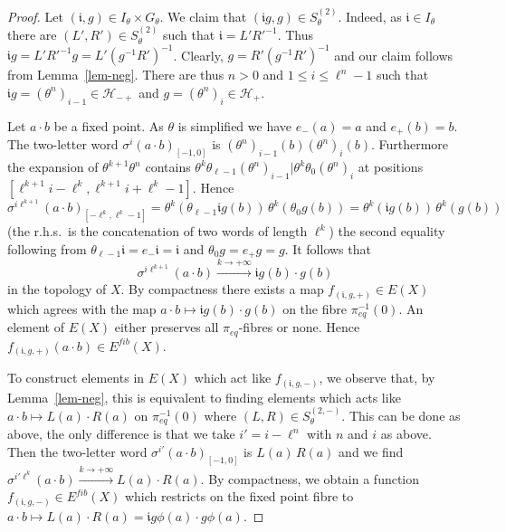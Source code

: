 \documentclass[10pt,a4paper]{amsart}
\numberwithin{equation}{section}
\newcommand{\ii}{{\mathfrak i}}
\newcommand{\Hh}{{\mathcal H}}
\newcommand{\pe}{\pi_{eq}}
\newcommand{\Ef}{E^{fib}}
\begin{document}
\begin{proof}
Let $(\ii ,g)\in I_\theta \times G_\theta$.
We claim that $(\ii g,g)\in S^{(2)}_\theta$. Indeed, as $\ii\in I_\theta$ there are 
$(L',R')\in S^{(2)}_\theta$ such that $\ii = L'{R'}^{-1}$. Thus
  $\ii g = L'{R'}^{-1}g = L'(g^{-1} R')^{-1}$. Clearly, $g = R' (g^{-1} R')^{-1}$ and our claim follows from Lemma~\ref{lem-neg}.
There are thus $n>0$ and $1\leq i\leq \ell^n-1$ such that
$ \ii g =(\theta^n)_{i-1}\in \Hh_{-+}$ and $g =(\theta^n)_i\in \Hh_+$.
 
Let $a\cdot b$ be a fixed point. As $\theta$ is simplified we have $e_{-}(a) = a$ and $e_{+}(b) = b$.
The two-letter word $\sigma^{i}(a\cdot b)_{[-1,0]}$ is $(\theta^n)_{i-1}(b)(\theta^n)_i(b)$. Furthermore 
the expansion of 
$\theta^{k+1}\theta^n$ contains $\theta^k\theta_{\ell-1} (\theta^n)_{i-1}| \theta^k\theta_0 (\theta^n)_{i}$ at positions  
 $[\ell^{k+1}i- \ell^k,\ell^{k+1}i+\ell^k-1]$.
Hence 
$$\sigma^{i\ell^{k+1}}(a\cdot b)_{[-\ell^k,\ell^k-1]} =\theta^k (\theta_{\ell-1} \ii g(b)) \,\theta^k (\theta_0  g(b)) = \theta^k (\ii g(b))\, \theta^k (g(b))$$
(the r.h.s.\ is the concatenation of two words of length $\ell^k$)  
the second equality following from $\theta_{\ell-1} \ii=e_-\ii = \ii$ and $ \theta_0 g=e_+ g = g$. 
It follows that    
$$\sigma^{i \ell^{k+1}}(a\cdot b)   \stackrel{k\to +\infty}\longrightarrow 
\ii g(b)\cdot g(b)$$
in the topology of $X$.
By compactness there exists a map $f_{(\ii ,g,+)}\in E(X)$ which agrees with the map 
$a\cdot b\mapsto \ii g(b)\cdot g(b)$ on the fibre $\pe^{-1}(0)$. An element of $E(X)$ either preserves all $\pe$-fibres or none. Hence 
$f_{(\ii ,g,+)}(a\cdot b)\in \Ef(X)$.

To construct elements in $E(X)$ which act like $f_{(\ii ,g,-)}$, we observe that, by Lemma~\ref{lem-neg}, this is equivalent to finding elements which acts like  
$a\cdot b\mapsto L(a)\cdot R(a)$ on $\pe^{-1}(0)$ where 
$(L,R)\in S^{(2,-)}_\theta$. This can be done as above, the only difference is that we take 
$i' = i-\ell^{n}$ with $n$ and $i$ as above. Then the two-letter word $\sigma^{i'}(a\cdot b)_{[-1,0]}$ is $L(a)\,R(a)$ and we find 
$\sigma^{i' \ell^k}(a\cdot b)   \stackrel{k\to +\infty}\longrightarrow 
L(a)\cdot R(a)$.  
By compactness, we obtain a function $f_{(\ii ,g,-)}\in \Ef(X)$ which restricts on the fixed point fibre to $a\cdot b\mapsto L(a)\cdot R(a) = \ii g \phi(a) \cdot g\phi(a)$.
\end{proof}
\end{document}
